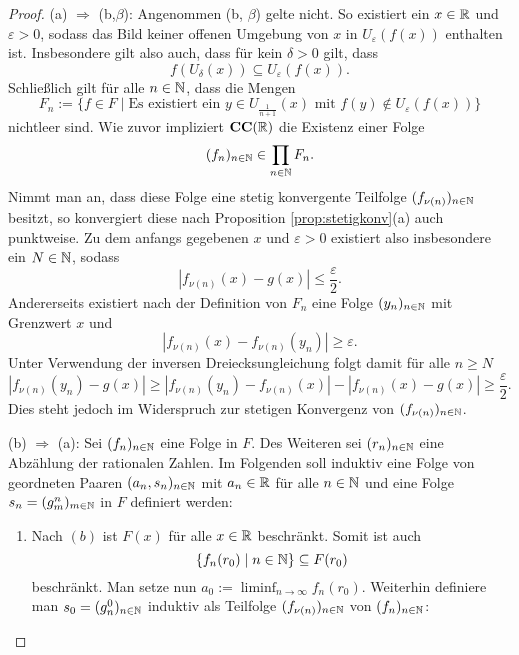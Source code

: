 \begin{proof}
  (a) $\Rightarrow$ (b,$\beta$):
  Angenommen (b, $\beta$) gelte nicht.
  So existiert ein $x \in \mathbb{R}$ und $\varepsilon > 0$, sodass das Bild keiner offenen Umgebung von $x$ in $U_\varepsilon(f(x))$ enthalten ist.
  Insbesondere gilt also auch, dass für kein $\delta > 0$ gilt, dass
  \begin{displaymath}
    f(U_\delta(x)) \subseteq U_\varepsilon(f(x)).
  \end{displaymath}
  Schließlich gilt für alle $n \in \mathbb{N}$, dass die Mengen
  \begin{displaymath}
    F_n := \{ f \in F \mid \text{Es existiert ein } y \in U_{\frac{1}{n+1}}(x) \text{ mit } f(y) \not\in U_\varepsilon(f(x)) \}
  \end{displaymath}
  nichtleer sind.
  Wie zuvor impliziert $\mathbf{CC}(\mathbb{R})$ die Existenz einer Folge 
  \begin{displaymath}
    (f_n)_{n \in \mathbb{N}} \in \prod_{n \in \mathbb{N}} F_n.
  \end{displaymath}
  Nimmt man an, dass diese Folge eine stetig konvergente Teilfolge $(f_{\nu(n)})_{n \in \mathbb{N}}$ besitzt, so konvergiert diese nach Proposition \ref{prop:stetigkonv}(a) auch punktweise.
  Zu dem anfangs gegebenen $x$ und $\varepsilon > 0$ existiert also insbesondere ein $N \in \mathbb{N}$, sodass
  \begin{displaymath}
    | f_{\nu(n)}(x) - g(x) | \leq \frac{\varepsilon}{2}.
  \end{displaymath}
  Andererseits existiert nach der Definition von $F_n$ eine Folge $(y_n)_{n \in \mathbb{N}}$ mit Grenzwert $x$ und
  \begin{displaymath}
    | f_{\nu(n)}(x) -  f_{\nu(n)}(y_n) | \geq \varepsilon.
  \end{displaymath}
  Unter Verwendung der inversen Dreiecksungleichung folgt damit für alle $n \geq N$
  \begin{displaymath}
    | f_{\nu(n)}(y_n) - g(x) | 
    \geq 
    | f_{\nu(n)}(y_n) - f_{\nu(n)}(x) | - | f_{\nu(n)}(x) - g(x)  | 
    \geq \frac{\varepsilon}{2}.
  \end{displaymath}
  Dies steht jedoch im Widerspruch zur stetigen Konvergenz von $(f_{\nu(n)})_{n \in \mathbb{N}}$.

  (b) $\Rightarrow$ (a):
  Sei $(f_n)_{n \in \mathbb{N}}$ eine Folge in $F$.
  Des Weiteren sei $(r_n)_{n \in \mathbb{N}}$ eine Abzählung der rationalen Zahlen.
  Im Folgenden soll induktiv eine Folge von geordneten Paaren $(a_n, s_n)_{n \in \mathbb{N}}$ mit $a_n \in \mathbb{R}$ für alle $n \in \mathbb{N}$ und eine Folge $s_n = (g_m^n)_{m \in \mathbb{N}}$ in $F$ definiert werden:
  \begin{enumerate}
    \item 
      Nach $(b)$ ist $F(x)$ für alle $x \in \mathbb{R}$ beschränkt. 
      Somit ist auch 
      \begin{displaymath}
        \{f_n(r_0) \mid n \in \mathbb{N}\} \subseteq F(r_0)
      \end{displaymath}
      beschränkt.
      Man setze nun $a_0 := \liminf_{n \to \infty} f_n(r_0)$.
      Weiterhin definiere man $s_0 = (g_n^0)_{n \in \mathbb{N}}$ induktiv als Teilfolge $(f_{\nu(n)})_{n \in \mathbb{N}}$ von $(f_n)_{n \in \mathbb{N}}$:
      \begin{itemize}


\end{itemize}
\end{enumerate}
\end{proof}
